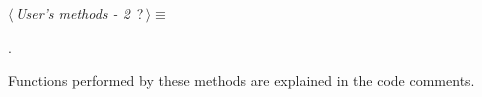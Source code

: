 \begin{flushleft} \small
\begin{minipage}{\linewidth}\label{scrap24}\raggedright\small
{} $\langle\,${\itshape {User's methods - 2}}\nobreak\ {\footnotesize {?}}$\,\rangle\equiv$
\vspace{-1ex}
\begin{list}{}{} \item

                
        {\NWsep}
\end{list}
\vspace{-1.5ex}
\footnotesize
\begin{list}{}{\setlength{\itemsep}{-\parsep}\setlength{\itemindent}{-\leftmargin}}
\item {\NWtxtMacroNoRef}.

\item{}
\end{list}
\end{minipage}\vspace{4ex}
\end{flushleft}
Functions performed by these methods are explained in the code comments.